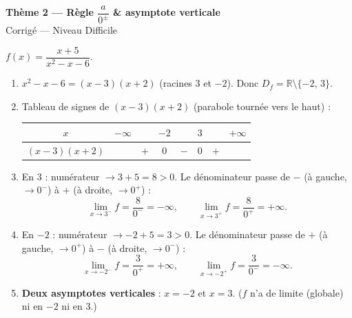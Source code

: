 \documentclass[11pt,a4paper]{article}
\newcommand{\R}{\mathbb{R}}
\begin{document}
\begin{center}
{\Large\bfseries\color{primarydark}Thème 2 — Règle $\dfrac{a}{0^{\pm}}$ \& asymptote verticale}\\[2pt]
{\large\color{excol}Corrigé — Niveau Difficile}
\end{center}
\vspace{6pt}

\begin{correction}
$f(x)=\dfrac{x+5}{x^2-x-6}$.
\begin{enumerate}[label=\alph*),leftmargin=2em,itemsep=3pt]
  \item $x^2-x-6=(x-3)(x+2)$ (racines $3$ et $-2$). Donc $D_f=\R\setminus\{-2,\,3\}$.
  \item Tableau de signes de $(x-3)(x+2)$ (parabole tournée vers le haut) :
  \begin{center}
  \renewcommand{\arraystretch}{1.25}
  \begin{tabular}{c|ccccccc}
  \toprule
  $x$ & $-\infty$ & & $-2$ & & $3$ & & $+\infty$\\
  \midrule
  $(x-3)(x+2)$ & & $+$ & $0$ & $-$ & $0$ & $+$ & \\
  \bottomrule
  \end{tabular}
  \end{center}
  \item En $3$ : numérateur $\to 3+5=8>0$. Le dénominateur passe de $-$ (à gauche, $\to 0^{-}$) à $+$
        (à droite, $\to 0^{+}$) :
        \[ \lim_{x\to 3^{-}} f=\frac{8}{0^{-}}=-\infty,\qquad \lim_{x\to 3^{+}} f=\frac{8}{0^{+}}=+\infty. \]
  \item En $-2$ : numérateur $\to -2+5=3>0$. Le dénominateur passe de $+$ (à gauche, $\to 0^{+}$) à $-$
        (à droite, $\to 0^{-}$) :
        \[ \lim_{x\to -2^{-}} f=\frac{3}{0^{+}}=+\infty,\qquad \lim_{x\to -2^{+}} f=\frac{3}{0^{-}}=-\infty. \]
  \item \textbf{Deux asymptotes verticales} : $x=-2$ et $x=3$. ($f$ n'a de limite (globale) ni en $-2$ ni en $3$.)
\end{enumerate}
\end{correction}
\end{document}
